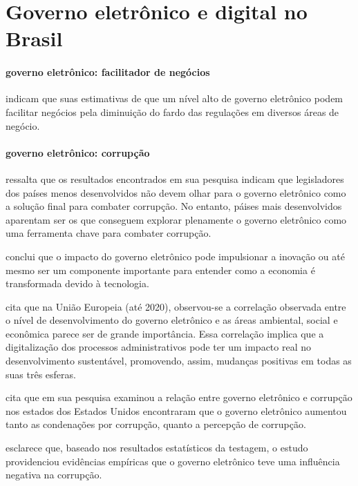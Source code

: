 \chapter{Governo eletrônico e digital no Brasil}

\subsubsection{governo eletrônico: facilitador de negócios}

\cite{martins2022digital} indicam que suas estimativas de que um nível alto de governo eletrônico podem facilitar negócios pela diminuição do fardo das regulações em diversos áreas de negócio.

\subsubsection{governo eletrônico: corrupção}

\cite{martins2018war} ressalta que os resultados encontrados em sua pesquisa indicam que legisladores dos países menos desenvolvidos não devem olhar para o governo eletrônico como a solução final para combater corrupção. No entanto, páises mais desenvolvidos aparentam ser os que conseguem explorar plenamente o governo eletrônico como uma ferramenta chave para combater corrupção.

\cite{kotenok2020government} conclui que o impacto do governo eletrônico pode impulsionar a inovação ou até mesmo ser um componente importante para entender como a economia é transformada devido à tecnologia.

\cite{ziolo2022government} cita que na União Europeia (até 2020), observou-se a correlação observada entre o nível de desenvolvimento do governo eletrônico e as áreas ambiental, social e econômica parece ser de grande importância. Essa correlação implica que a digitalização dos processos administrativos pode ter um impacto real no desenvolvimento sustentável, promovendo, assim, mudanças positivas em todas as suas três esferas.

\cite{yamarik2023does} cita que em sua pesquisa examinou a relação entre governo eletrônico e corrupção nos estados dos Estados Unidos encontraram que o governo eletrônico aumentou tanto as condenações por corrupção, quanto a percepção de corrupção.

\cite{sugiarti2024effect} esclarece que, baseado nos resultados estatísticos da testagem, o estudo providenciou evidências empíricas que o governo eletrônico teve uma influência negativa na corrupção.

